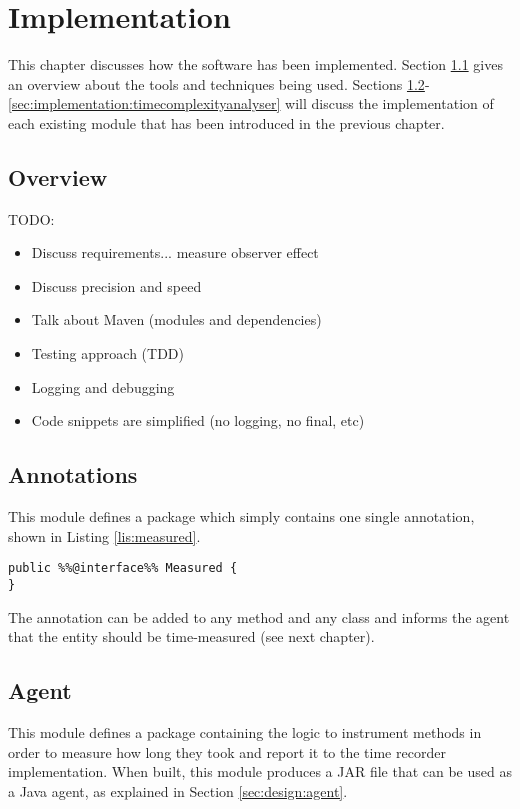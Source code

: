 \chapter{Implementation}

This chapter discusses how the software has been implemented. Section \ref{sec:implementation:overview} gives an overview about the tools and techniques being used. Sections \ref{sec:implementation:annotations}-\ref{sec:implementation:timecomplexityanalyser} will discuss the implementation of each existing module that has been introduced in the previous chapter.

\section{Overview}
\label{sec:implementation:overview}

TODO:
\begin{itemize}
  \item Discuss requirements... measure observer effect
  \item Discuss precision and speed
  \item Talk about Maven (modules and dependencies)
  \item Testing approach (TDD)
  \item Logging and debugging
  \item Code snippets are simplified (no logging, no final, etc)
\end{itemize}

\section{Annotations}
\label{sec:implementation:annotations} 
This module defines a package  which simply contains one single annotation, shown in Listing \ref{lis:measured}.
\begin{lstlisting}[caption={Measured annotation},label=lis:measured]
public %%@interface%% Measured {
}
\end{lstlisting}

\noindent The annotation can be added to any method and any class and informs the agent that the entity should be time-measured (see next chapter).


\section{Agent}
This module defines a package  containing the logic to instrument methods in order to measure how long they took and report it to the time recorder implementation. When built, this module produces a JAR file that can be used as a Java agent, as explained in Section \ref{sec:design:agent}.

